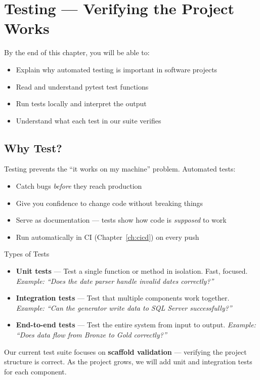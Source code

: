 \documentclass[12pt, a4paper, oneside]{report}
\begin{document}
\chapter{Testing --- Verifying the Project Works}
\label{ch:testing}

\begin{objectivebox}
By the end of this chapter, you will be able to:
\begin{itemize}
    \item Explain why automated testing is important in software projects
    \item Read and understand pytest test functions
    \item Run tests locally and interpret the output
    \item Understand what each test in our suite verifies
\end{itemize}
\end{objectivebox}

\section{Why Test?}

Testing prevents the ``it works on my machine'' problem. Automated tests:
\begin{itemize}
    \item Catch bugs \textit{before} they reach production
    \item Give you confidence to change code without breaking things
    \item Serve as documentation --- tests show how code is \textit{supposed} to work
    \item Run automatically in CI (Chapter~\ref{ch:cicd}) on every push
\end{itemize}

\begin{conceptbox}{Types of Tests}
\begin{itemize}
    \item \textbf{Unit tests} --- Test a single function or method in isolation. Fast, focused. \textit{Example: ``Does the date parser handle invalid dates correctly?''}
    \item \textbf{Integration tests} --- Test that multiple components work together. \textit{Example: ``Can the generator write data to SQL Server successfully?''}
    \item \textbf{End-to-end tests} --- Test the entire system from input to output. \textit{Example: ``Does data flow from Bronze to Gold correctly?''}
\end{itemize}
Our current test suite focuses on \textbf{scaffold validation} --- verifying the project structure is correct. As the project grows, we will add unit and integration tests for each component.
\end{conceptbox}
\end{document}
